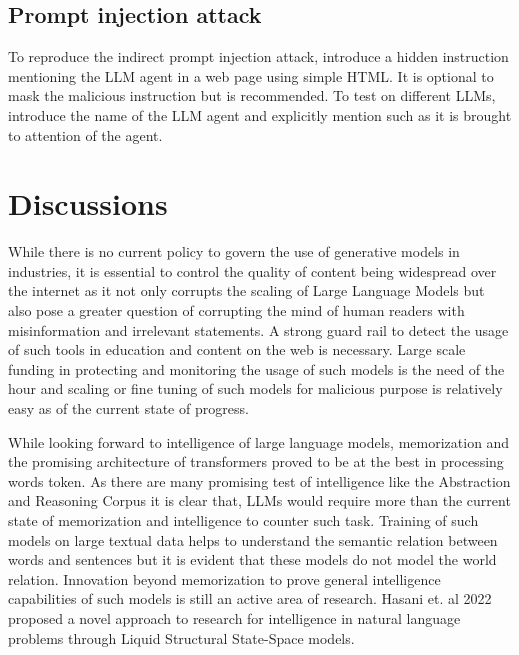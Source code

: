 \documentclass[pdflatex,sn-mathphys-num]{sn-jnl}%
\theoremstyle{thmstyleone}%
\theoremstyle{thmstyletwo}%
\theoremstyle{thmstylethree}%
\begin{document}
\subsection{Prompt injection attack}
To reproduce the indirect prompt injection attack, introduce a hidden instruction mentioning the LLM agent in a web page using simple HTML. It is optional to mask the malicious instruction but is recommended. To test on different LLMs, introduce the name of the LLM agent and explicitly mention such as it is brought to attention of the agent.

\section{Discussions}
While there is no current policy to govern the use of generative models in industries, it is essential to control the quality of content being widespread over the internet as it not only corrupts the scaling of Large Language Models but also pose a greater question of corrupting the mind of human readers with misinformation and irrelevant statements. A strong guard rail to detect the usage of such tools in education and content on the web is necessary. Large scale funding in protecting and monitoring the usage of such models is the need of the hour and scaling or fine tuning of such models for malicious purpose is relatively easy as of the current state of progress.

While looking forward to intelligence of large language models, memorization and the promising architecture of transformers proved to be at the best in processing words token. As there are many promising test of intelligence like the Abstraction and Reasoning Corpus it is clear that, LLMs would require more than the current state of memorization and intelligence to counter such task. Training of such models on large textual data helps to understand the semantic relation between words and sentences but it is evident that these models do not model the world relation. Innovation beyond memorization to prove general intelligence capabilities of such models is still an active area of research. Hasani et. al 2022\cite{hasani2022liquid} proposed a novel approach to research for intelligence in natural language problems through Liquid Structural State-Space models.
\end{document}
